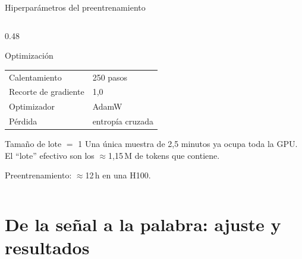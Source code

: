 \documentclass[aspectratio=169,10pt]{beamer}
\begin{document}
\begin{frame}[c]{Hiperparámetros del preentrenamiento}
\begin{columns}[t,totalwidth=\linewidth]
\begin{column}{0.48\linewidth}
\begin{block}{Optimización}
\begin{tabular}{@{}ll@{}}
          Calentamiento & 250 pasos \\
          Recorte de gradiente & 1,0 \\
          Optimizador & AdamW \\
          Pérdida & entropía cruzada \\
          \bottomrule
        \end{tabular}
      \end{block}
      \begin{alertblock}{Tamaño de lote $=$ 1}
        \footnotesize Una única muestra de 2,5 minutos ya ocupa toda la GPU. El ``lote'' efectivo son los $\approx$1,15\,M de tokens que contiene.
      \end{alertblock}
      {\footnotesize\color{muted} Preentrenamiento: $\approx$12\,h en una H100.}
    \end{column}
  \end{columns}
\end{frame}

\section{De la señal a la palabra: ajuste y resultados}
\end{document}
